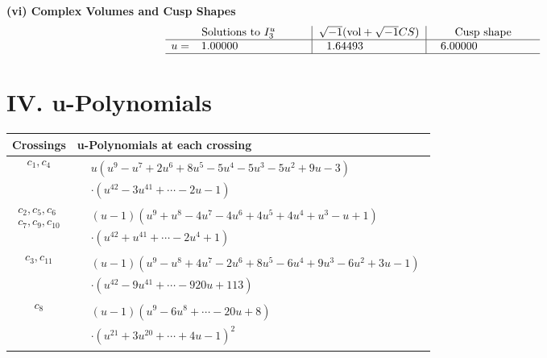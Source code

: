 \documentclass[1p]{elsarticle_modified}
\theoremstyle{definition}
\newcommand{\I}{\sqrt{-1}}
\begin{document}
\newpage\flushleft \textbf{(vi) Complex Volumes and Cusp Shapes}
$$\begin{array}{c|c|c}  
\text{Solutions to }I^u_{3}& \I (\text{vol} + \sqrt{-1}CS) & \text{Cusp shape}\\
 \hline 
\begin{aligned}
u &= \phantom{-}1.00000\phantom{ +0.000000I}\end{aligned}
 & \phantom{-}1.64493\phantom{ +0.000000I} & \phantom{-}6.00000\phantom{ +0.000000I}\\
 \hline 
 \end{array}$$\newpage
\newpage\renewcommand{\arraystretch}{1}
\centering \section*{ IV. u-Polynomials}
\begin{tabular}{m{50pt}|m{274pt}}
Crossings & \hspace{64pt}u-Polynomials at each crossing \\
\hline $$\begin{aligned}c_{1},c_{4}\end{aligned}$$&$\begin{aligned}
&u(u^9- u^7+2 u^6+8 u^5-5 u^4-5 u^3-5 u^2+9 u-3)\\
&\cdot(u^{42}-3 u^{41}+\cdots-2 u-1)
\end{aligned}$\\
\hline $$\begin{aligned}c_{2},c_{5},c_{6}\\c_{7},c_{9},c_{10}\end{aligned}$$&$\begin{aligned}
&(u-1)(u^9+u^8-4 u^7-4 u^6+4 u^5+4 u^4+u^3- u+1)\\
&\cdot(u^{42}+u^{41}+\cdots-2 u^4+1)
\end{aligned}$\\
\hline $$\begin{aligned}c_{3},c_{11}\end{aligned}$$&$\begin{aligned}
&(u-1)(u^9- u^8+4 u^7-2 u^6+8 u^5-6 u^4+9 u^3-6 u^2+3 u-1)\\
&\cdot(u^{42}-9 u^{41}+\cdots-920 u+113)
\end{aligned}$\\
\hline $$\begin{aligned}c_{8}\end{aligned}$$&$\begin{aligned}
&(u-1)(u^9-6 u^8+\cdots-20 u+8)\\
&\cdot(u^{21}+3 u^{20}+\cdots+4 u-1)^{2}
\end{aligned}$\\
\hline
\end{tabular}\newpage\renewcommand{\arraystretch}{1}
\end{document}

